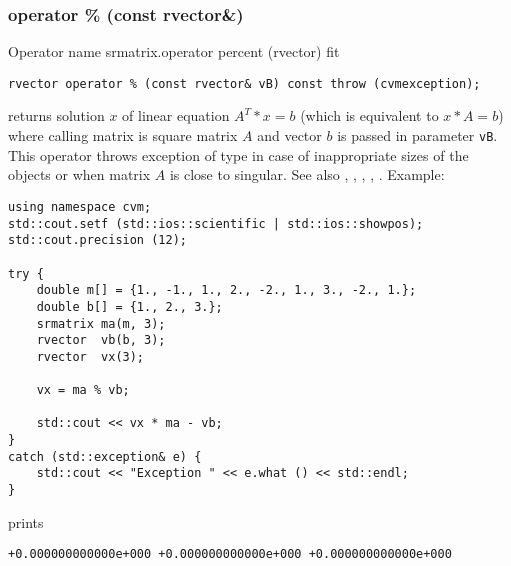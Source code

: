 \subsubsection{operator \% (const rvector\&)}
Operator%
\pdfdest name {srmatrix.operator percent (rvector)} fit
\begin{verbatim}
rvector operator % (const rvector& vB) const throw (cvmexception);
\end{verbatim}
returns solution $x$ of  linear equation
$A^T*x=b$ (which is equivalent to $x*A=b$) 
where calling matrix is square matrix $A$
and vector $b$ is passed in parameter \verb"vB".
This operator throws exception 
of type 
in case of inappropriate sizes
of the objects or when  matrix $A$ is close to singular.
See also , 
, 
, 
, .
Example:
\begin{Verbatim}
using namespace cvm;
std::cout.setf (std::ios::scientific | std::ios::showpos);
std::cout.precision (12);

try {
    double m[] = {1., -1., 1., 2., -2., 1., 3., -2., 1.};
    double b[] = {1., 2., 3.};
    srmatrix ma(m, 3);
    rvector  vb(b, 3);
    rvector  vx(3);

    vx = ma % vb;

    std::cout << vx * ma - vb;
}
catch (std::exception& e) {
    std::cout << "Exception " << e.what () << std::endl;
}
\end{Verbatim}
prints
\begin{Verbatim}
+0.000000000000e+000 +0.000000000000e+000 +0.000000000000e+000
\end{Verbatim}
\newpage






